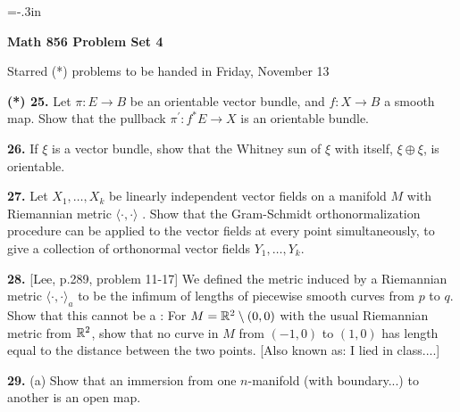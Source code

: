
\nopagenumbers

\vsize=10in
\voffset=-.3in


\loadmsbm

\def\ctln{\centerline}
\def\ssk{\smallskip}
\def\msk{\medskip}
\def\bsk{\bigskip}
\def\nidt{\noindent}
\def\del{\partial}
\def\bbr{{\Bbb R}}
\def\cla{{\Cal A}}
\def\clb{{\Cal B}}
\def\clc{{\Cal C}}
\def\ra{\rightarrow}
\def\lra{$\Leftrightarrow$}

\ctln{\bf Math 856 Problem Set 4}

\ssk

\ctln{Starred (*) problems to be handed in Friday, November 13}

\bsk


\item{\bf (*) 25.} Let $\pi:E\ra B$ be an orientable vector bundle, and
$f:X\ra B$ a smooth map. Show that the pullback $\pi^\prime:f^*E\ra X$
is an orientable bundle.

\msk

\item{\bf 26.} If $\xi$ is a vector bundle, show that the Whitney sun of $\xi$
with itself, $\xi\oplus \xi$, is orientable.

\msk

\item{\bf 27.} Let $X_1,\ldots ,X_k$ be linearly independent vector fields on a manifold
$M$ with Riemannian metric $\langle\cdot,\cdot\rangle$ . Show that the Gram-Schmidt
orthonormalization procedure can be applied to the vector fields at every point 
simultaneously, to give a collection of 
orthonormal vector fields $Y_1,\ldots ,Y_k$.


\item{\bf 28.} [Lee, p.289, problem 11-17] We defined the metric induced by a Riemannian
metric $\langle\cdot,\cdot\rangle_a$ to be the infimum of lengths of piecewise smooth
curves from $p$ to $q$. Show that this cannot be a : For $M=\bbr^2\setminus(0,0)$
with the usual Riemannian metric from $\bbr^2$, show that no curve in $M$ from $(-1,0)$ to $(1,0)$
has length equal to the distance between the two points. [Also known as: I lied in class....]

\msk

\item{\bf 29.} (a) Show that an immersion from one $n$-manifold 
(with boundary...) to another is an open map.

\ssk

